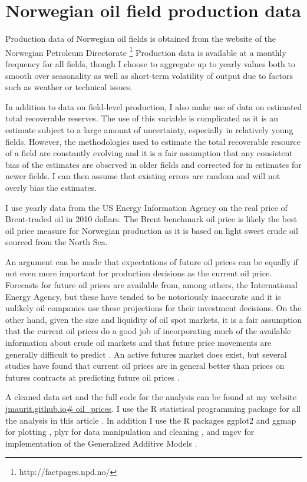\documentclass[12pt]{scrartcl} %
\begin{document}
\section{Norwegian oil field production data}
Production data of Norwegian oil fields is obtained from the website of the Norwegian Petroleum Directorate \footnote{http://factpages.npd.no/}  Production data is available at a monthly frequency for all fields, though I choose to aggregate up to yearly values both to smooth over seasonality as well as short-term volatility of output due to factors such as weather or technical issues.  

In addition to data on field-level production, I also make use of data on estimated total recoverable reserves.  The use of this variable is complicated as it is an estimate subject to a large amount of uncertainty, especially in relatively young fields.  However, the methodologies used to estimate the total recoverable resource of a field are constantly evolving and it is a fair assumption that any consistent bias of the estimates are observed in older fields and corrected for in estimates for newer fields.  I can then assume that existing errors are random and will not overly bias the estimates.  

I use yearly data from the US Energy Information Agency on the real price of Brent-traded oil in 2010 dollars.  The Brent benchmark oil price is likely the best oil price measure for Norwegian production as it is based on light sweet crude oil sourced from the North Sea.  

An argument can be made that expectations of future oil prices can be equally if not even more important for production decisions as the current oil price.  Forecasts for future oil prices are available from, among others, the International Energy Agency, but these have tended to be notoriously inaccurate and it is unlikely oil companies use these projections for their investment decisions.  On the other hand, given the size and liquidity of oil spot markets, it is a fair assumption that the current oil prices do a good job of incorporating much of the available information about crude oil markets and that future price movements are generally difficult to predict \citet{hamilton_understanding_2008}.  An active futures market does exist, but several studies have found that current oil prices are in general better than prices on futures contracts at predicting future oil prices \citep{alquist_what_2010, chinn_predictive_2005}.

A cleaned data set and the full code for the analysis can be found at my website \url{jmaurit.github.io# oil_prices}. I use the R statistical programming package for all the analysis in this article \citet{team_r:_2013}.  In addition I use the R packages ggplot2 and ggmap for plotting \citep{wickham_ggplot2:_2009, kahle_ggmap:_2013}, plyr for data manipulation and cleaning \citep{wickham_split-apply-combine_2011}, and mgcv for implementation of the Generalized Additive Models \citep{wood_fast_2011}.
\end{document}
